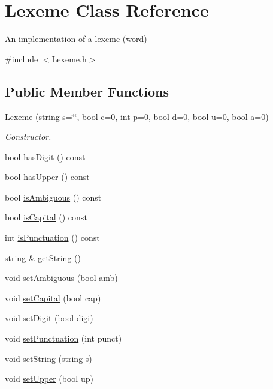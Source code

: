 \hypertarget{class_lexeme}{}\section{Lexeme Class Reference}
\label{class_lexeme}


An implementation of a lexeme (word)  




{\ttfamily \#include $<$Lexeme.\+h$>$}

\subsection*{Public Member Functions}
\begin{DoxyCompactItemize}
\item 
\hyperlink{class_lexeme_a91ec217d9cc9c11b33597705b1f2ef88}{Lexeme} (string s=\char`\"{}\char`\"{}, bool c=0, int p=0, bool d=0, bool u=0, bool a=0)
\begin{DoxyCompactList}\small\item\em Constructor. \end{DoxyCompactList}\item 
bool \hyperlink{class_lexeme_a01b2154c183663f7e298b564d14a907e}{has\+Digit} () const
\item 
bool \hyperlink{class_lexeme_a5b40ad2f0863cbae11b0dd2c7876d8e8}{has\+Upper} () const
\item 
bool \hyperlink{class_lexeme_a6319c062333968f1d47f69d7fd44900c}{is\+Ambiguous} () const
\item 
bool \hyperlink{class_lexeme_afa5bf60e2cd601b4755cc137c56f7aed}{is\+Capital} () const
\item 
int \hyperlink{class_lexeme_a67fb5732247889cb97612dd327c7a194}{is\+Punctuation} () const
\item 
string \& \hyperlink{class_lexeme_ac3bedb54fb40b5b7d85edb3cf2d715db}{get\+String} ()
\item 
void \hyperlink{class_lexeme_a8fd310c078c13d53dc601c299d0acb78}{set\+Ambiguous} (bool amb)
\item 
void \hyperlink{class_lexeme_aa54d86594141f95df8a0364aebc931f2}{set\+Capital} (bool cap)
\item 
void \hyperlink{class_lexeme_a4bf15e88113bc3cd10dff188fef37752}{set\+Digit} (bool digi)
\item 
void \hyperlink{class_lexeme_a620288e33ed2b3957023b3d325febc13}{set\+Punctuation} (int punct)
\item 
void \hyperlink{class_lexeme_a90a1a2080fb503b0a206a075fd4d038a}{set\+String} (string s)
\item 
void \hyperlink{class_lexeme_a09873449eb90bc9be0f4df1edcf97b26}{set\+Upper} (bool up)
\end{DoxyCompactItemize}


